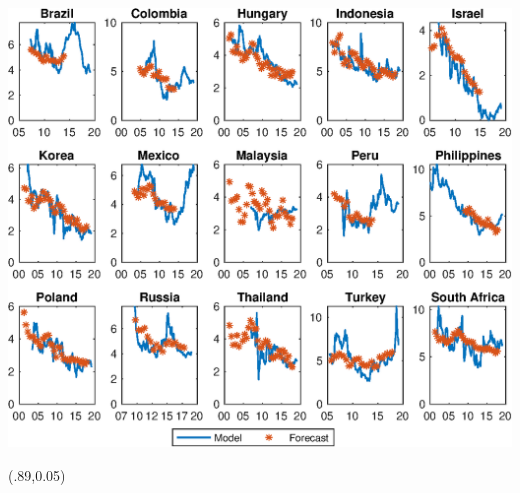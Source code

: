 \documentclass[12pt, aspectratio=169, xcolor=dvipsnames]{beamer}  %
\begin{document}
\begin{frame}[label=yPscbp]
\begin{center}							%
	\includegraphics[trim={0cm 0cm 0cm 0cm},clip,height=0.86\textheight,width=\linewidth]{../Figures/Estimation/bsl_yP_scbp.eps} \\
\end{center}
\begin{textblock*}{5cm}(.89\textwidth,0.05\textheight)
	\hyperlink{YldDcmp}{}
\end{textblock*}
\end{frame}
\end{document}
